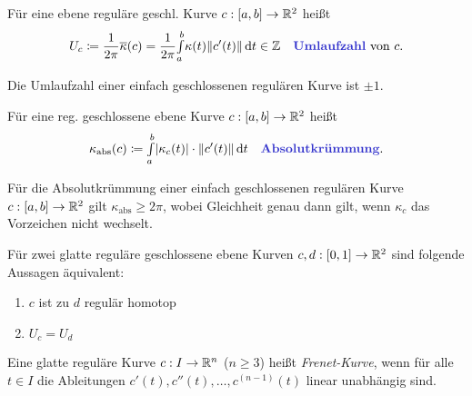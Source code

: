 \documentclass{cheat-sheet}
\newcommand{\Intabdt}[1]{\Int{a}{b}{#1}{t}}
\begin{document}
\begin{satz}
  Für eine ebene reguläre geschl. Kurve $c : \left[ a, b \right] \to \mathbb{R}^2$ heißt
  \[
    U_c \coloneqq \frac{1}{2 \pi} \overline\kappa(c) = \frac{1}{2 \pi} \Intabdt{\kappa(t) \norm{c'(t)}} \in \Z
    \quad \text{\emph{Umlaufzahl} von $c$}.
  \]
\end{satz}

\begin{satz}
  Die Umlaufzahl einer einfach geschlossenen regulären Kurve ist $\pm 1$.
\end{satz}

\begin{defn}
  Für eine reg. geschlossene ebene Kurve $c : \left[ a, b \right] \to \mathbb{R}^2$ heißt
  \[
    \kappa_{\mathrm{abs}}(c) \coloneqq \Int{a}{b}{\abs{\kappa_c(t)} \cdot \norm{c'(t)}}{t}
    \quad \text{\emph{Absolutkrümmung}.}
  \]
\end{defn}

\begin{satz}
  Für die Absolutkrümmung einer einfach geschlossenen regulären Kurve $c : \left[ a, b \right] \to \mathbb{R}^2$ gilt $\kappa_{\text{abs}} \geq 2 \pi$, wobei Gleichheit genau dann gilt, wenn $\kappa_c$ das Vorzeichen nicht wechselt.
\end{satz}


\begin{satz}
  Für zwei glatte reguläre geschlossene ebene Kurven $c, d : \left[ 0, 1 \right] \to \mathbb{R}^2$ sind folgende Aussagen äquivalent:
  \begin{multicols}{2}
    \begin{enumerate}[label=(\roman*),leftmargin=2em]
      \item $c$ ist zu $d$ regulär homotop
      \item $U_c = U_d$
    \end{enumerate}
  \end{multicols}
\end{satz}



\begin{defn}
  Eine glatte reguläre Kurve $c : I \to \mathbb{R}^n$ ($n \geq 3$) heißt \emph{Frenet-Kurve}, wenn für alle $t \in I$ die Ableitungen $c'(t), c''(t), \ldots, c^{(n-1)}(t)$ linear unabhängig sind.
\end{defn}
\end{document}
